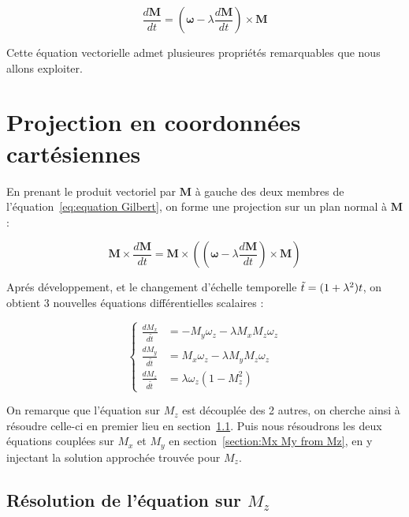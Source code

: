 \documentclass[12pt]{report}
\begin{document}
\begin{equation}
    \frac{d\bm{M}}{dt} = (\bm{\omega}-\lambda \frac{d{\bm{M}}}{dt})\times\bm{M} 
    \label{eq:equation Gilbert}
\end{equation}

Cette équation vectorielle admet plusieures propriétés remarquables que nous allons exploiter.

\section{Projection en coordonnées cartésiennes}
\label{sec:projection_cartesiennes}

En prenant le produit vectoriel par $\bm M$ à gauche des deux membres de l'équation~\ref{eq:equation Gilbert}, on forme une projection sur un plan normal à $\bm{M}$ :

\begin{equation}
    \bm{M}\times\frac{d\bm{M}}{dt} = \bm{M}\times((\bm{\omega}-\lambda \frac{d{\bm{M}}}{dt})\times\bm{M} )
    \label{eq:equation Gilbert produit vectoriel}
\end{equation}

Aprés développement, et le changement d'échelle temporelle $\Tilde{t} = (1+\lambda^2)t$, on obtient 3 nouvelles équations différentielles scalaires :

\begin{equation}
    \left\{
        \begin{aligned}
            \frac{dM_x}{d\tilde{t}} &= - M_y\omega_z - \lambda M_x M_z \omega_z \\
            \frac{dM_y}{d\tilde{t}} &= M_x\omega_z - \lambda M_y M_z \omega_z \\
            \frac{dM_z}{d\tilde{t}} &= \lambda\omega_z (1-M_z^2) 
        \end{aligned} 
    \right. 
    \label{eq:equations scalaires Gilbert}
\end{equation}

On remarque que l'équation sur $M_z$ est découplée des 2 autres, on cherche ainsi à résoudre celle-ci en premier lieu en section~\ref{section:Mz}. Puis nous résoudrons les deux équations couplées sur $M_x$ et $M_y$ en section~\ref{section:Mx My from Mz}, en y injectant la solution approchée trouvée pour $M_z$.

\subsection{Résolution de l'équation sur $M_z$}
\label{section:Mz}
\end{document}
